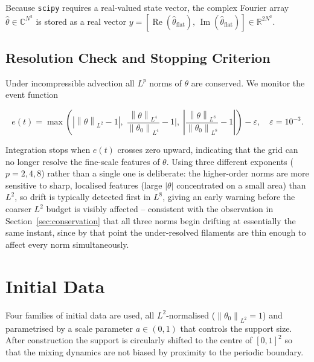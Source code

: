 \documentclass[12pt,a4paper]{article}
\newcommand{\norm}[1]{\left\lVert#1\right\rVert}
\theoremstyle{definition}
\theoremstyle{plain}
\begin{document}
Because \texttt{scipy} requires a real-valued state vector, the complex
Fourier array $\hat\theta\in\mathbb{C}^{N^2}$ is stored as a real vector
$y = [\operatorname{Re}(\hat\theta_{\text{flat}}),\,
       \operatorname{Im}(\hat\theta_{\text{flat}})]\in\mathbb{R}^{2N^2}$.

\subsection{Resolution Check and Stopping Criterion}
\label{sec:rescheck}

Under incompressible advection all $L^p$ norms of $\theta$ are conserved.
We monitor the event function

\begin{equation}
  e(t) = \max\!\left(
    |\norm{\theta}_{L^2}-1|,\;
    \frac{\norm{\theta}_{L^4}}{\norm{\theta_0}_{L^4}}-1\Bigg|,\;
    \left|\frac{\norm{\theta}_{L^8}}{\norm{\theta_0}_{L^8}}-1\right|
  \right) - \varepsilon,
  \quad \varepsilon = 10^{-3}.
\end{equation}

Integration stops when $e(t)$ crosses zero upward, indicating that the
grid can no longer resolve the fine-scale features of $\theta$. Using three
different exponents ($p=2,4,8$) rather than a single one is deliberate: the
higher-order norms are more sensitive to sharp, localised features (large
$|\theta|$ concentrated on a small area) than $L^2$, so drift is typically
detected first in $L^8$, giving an early warning before the coarser $L^2$
budget is visibly affected -- consistent with the observation in
Section~\ref{sec:conservation} that all three norms begin drifting at
essentially the same instant, since by that point the under-resolved
filaments are thin enough to affect every norm simultaneously.

\section{Initial Data}
\label{sec:idata}

Four families of initial data are used, all $L^2$-normalised
($\norm{\theta_0}_{L^2}=1$) and parametrised by a scale parameter
$a\in(0,1)$ that controls the support size.
After construction the support is circularly shifted to the centre of $[0,1]^2$
so that the mixing dynamics are not biased by proximity to the periodic
boundary.
\end{document}

